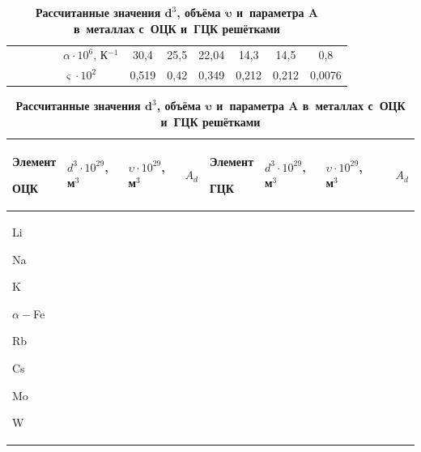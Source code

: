 \begin{table}[t!]
\begin{minipage}{.88\textwidth}
\begin{tabular}{p{3.8cm}|c|c|c|c|c|c}
\hline

~~~~~~~~~$\alpha \cdot 10^{6}$, К$^{-1}$& 

30,4& 

25,5& 

22,04& 

14,3& 

14,5& 

0,8 \\


~~~~~~~~~$\varsigma \cdot 10^2$& 

0,519& 

0,42& 

0,349& 

0,212& 

0,212& 

0,0076 \\

\hline

\end{tabular}

\end{minipage}



\bigskip

\smallskip

\centering

\caption{\bf Рассчитанные значения $\boldsymbol d^3$, объёма $\boldsymbol \upsilon $ и~параметра $\boldsymbol A$ в~металлах с~ОЦК и~ГЦК решётками}\vspace{-3mm}

\begin{tabular}{p{1.4cm}|p{1.4cm}|p{1.4cm}|p{.8cm}|p{1.4cm}|p{1.4cm}|p{1.4cm}|p{.8cm}}

\hline \centering

Элемент \par ОЦК&  \centering

$d^3\cdot 10^{29}$, м$^{3}$& \centering

$\upsilon \cdot 10^{29}$, м$^{3}$& \centering

$A_d$& \centering

Элемент \par ГЦК& \centering

$d^3\cdot 10^{29}$, м$^{3}$& \centering

$\upsilon \cdot 10^{29}$, м$^{3}$& 

~~$A_d$ \\

\hline\centering

Li \par Na \par K \par $\alpha -$Fe \par Rb \par Cs \par Mo \par W& \centering


\end{tabular}
\end{table}
